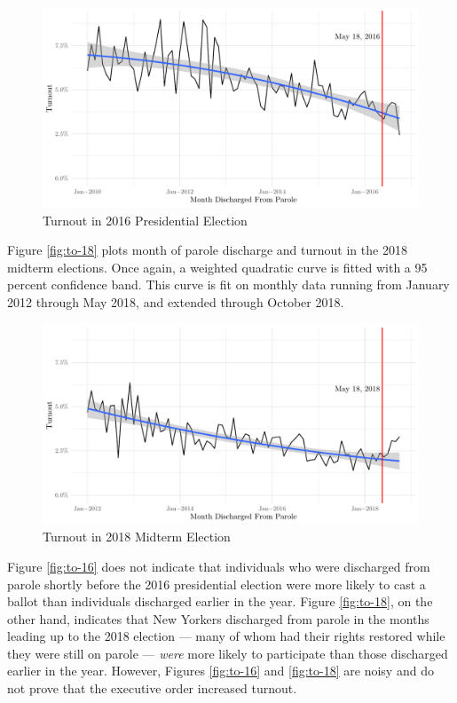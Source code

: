\documentclass[
  12pt,
]{article}
\begin{document}
\begin{figure}[H]

{\centering \includegraphics{part2_standalone_files/figure-latex/to-16-chart-1} 

}

\caption{\label{fig:to-16}Turnout in 2016 Presidential Election}\label{fig:to-16-chart}
\end{figure}

Figure \ref{fig:to-18} plots month of parole discharge and turnout in the 2018 midterm elections. Once again, a weighted quadratic curve is fitted with a 95 percent confidence band. This curve is fit on monthly data running from January 2012 through May 2018, and extended through October 2018.

\begin{figure}[H]

{\centering \includegraphics{part2_standalone_files/figure-latex/to-18-chart-1} 

}

\caption{\label{fig:to-18}Turnout in 2018 Midterm Election}\label{fig:to-18-chart}
\end{figure}

Figure \ref{fig:to-16} does not indicate that individuals who were discharged from parole shortly before the 2016 presidential election were more likely to cast a ballot than individuals discharged earlier in the year. Figure \ref{fig:to-18}, on the other hand, indicates that New Yorkers discharged from parole in the months leading up to the 2018 election --- many of whom had their rights restored while they were still on parole --- \emph{were} more likely to participate than those discharged earlier in the year. However, Figures \ref{fig:to-16} and \ref{fig:to-18} are noisy and do not prove that the executive order increased turnout.
\end{document}
